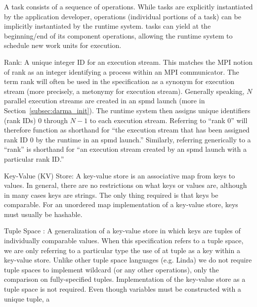 \begin{compactdesc}
  A \gls{task} consists of a sequence of \glspl{operation}.
  While \glspl{task} are explicitly instantiated by the application developer,
  \glspl{operation} (individual portions of a \gls{task}) can be implicitly
  instantiated by the \gls{runtime system}.
  \Glspl{task} can yield at the beginning/end of its component
  \glspl{operation}, allowing the \gls{runtime system} to schedule new work units for execution.
\item [Rank:] A unique integer ID for an \gls{execution stream}. This matches
  the MPI notion of \gls{rank} as an integer identifying a process within an MPI communicator.
  The term \gls{rank} will often be used in the specification as a synonym for
  \gls{execution stream} (more precisely, a metonymy for \gls{execution stream}).
  Generally speaking, $N$ parallel \glspl{execution stream} are created in an
  \gls{spmd} launch (more in Section~\ref{subsec:darma_init}).
  The \gls{runtime system} then assigns unique identifiers (\gls{rank} IDs) $0$ through
  $N-1$ to each \gls{execution stream}.
  Referring to ``\gls{rank} 0'' will therefore function as shorthand for ``the
  \gls{execution stream} that has been assigned \gls{rank} ID 0 by the runtime
  in an \gls{spmd} launch.'' Similarly, referring generically to a
  ``\gls{rank}'' is shorthand for ``an \gls{execution stream} created by an
  \gls{spmd} launch with a particular \gls{rank} ID.''
\item [Key-Value (KV) Store:] A \gls{key-value store} is an associative map from
keys to values. In general, there are no restrictions on what keys or values are, although in many
cases keys are strings.  The only thing required is that keys be comparable.
For an unordered map implementation of a \gls{key-value store}, keys must usually be hashable.
\item [Tuple Space]: A generalization of a \gls{key-value store} in which keys
  are \glspl{tuple} of individually comparable values.
  When this specification refers to a \gls{tuple space}, we are only referring to a particular type
  the use of at \gls{tuple} as a key within a \gls{key-value store}.
  Unlike other \gls{tuple space} languages (e.g. \gls{Linda}) we do not require
  \glspl{tuple space} to implement wildcard (or any other operations), only the
  comparison on fully-specified \glspl{tuple}.  Implementation of the
  \gls{key-value store} as a \gls{tuple space} is not required.  
  Even though variables must be constructed with a unique \gls{tuple}, a

\end{compactdesc}
